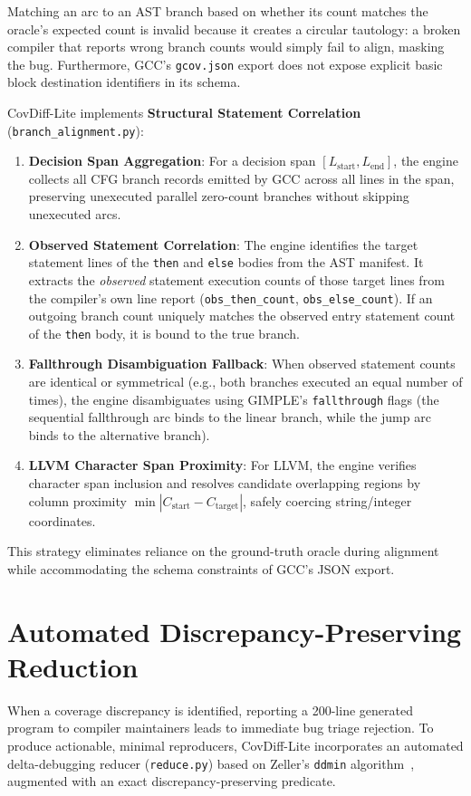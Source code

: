 \documentclass[sigconf,review,anonymous=false]{acmart}
\theoremstyle{definition}
\begin{document}
Matching an arc to an AST branch based on whether its count matches the oracle's expected count is invalid because it creates a circular tautology: a broken compiler that reports wrong branch counts would simply fail to align, masking the bug. Furthermore, GCC's \texttt{gcov.json} export does not expose explicit basic block destination identifiers in its schema.

CovDiff-Lite implements \textbf{Structural Statement Correlation} (\texttt{branch\_alignment.py}):
\begin{enumerate}
    \item \textbf{Decision Span Aggregation}: For a decision span $[L_{\text{start}}, L_{\text{end}}]$, the engine collects all CFG branch records emitted by GCC across all lines in the span, preserving unexecuted parallel zero-count branches without skipping unexecuted arcs.
    \item \textbf{Observed Statement Correlation}: The engine identifies the target statement lines of the \texttt{then} and \texttt{else} bodies from the AST manifest. It extracts the \textit{observed} statement execution counts of those target lines from the compiler's own line report (\texttt{obs\_then\_count}, \texttt{obs\_else\_count}). If an outgoing branch count uniquely matches the observed entry statement count of the \texttt{then} body, it is bound to the true branch.
    \item \textbf{Fallthrough Disambiguation Fallback}: When observed statement counts are identical or symmetrical (e.g., both branches executed an equal number of times), the engine disambiguates using GIMPLE's \texttt{fallthrough} flags (the sequential fallthrough arc binds to the linear branch, while the jump arc binds to the alternative branch).
    \item \textbf{LLVM Character Span Proximity}: For LLVM, the engine verifies character span inclusion and resolves candidate overlapping regions by column proximity $\min |C_{\text{start}} - C_{\text{target}}|$, safely coercing string/integer coordinates.
\end{enumerate}
This strategy eliminates reliance on the ground-truth oracle during alignment while accommodating the schema constraints of GCC's JSON export.

\section{Automated Discrepancy-Preserving Reduction}

When a coverage discrepancy is identified, reporting a 200-line generated program to compiler maintainers leads to immediate bug triage rejection. To produce actionable, minimal reproducers, CovDiff-Lite incorporates an automated delta-debugging reducer (\texttt{reduce.py}) based on Zeller's \texttt{ddmin} algorithm~\cite{zeller2002simplifying}, augmented with an exact discrepancy-preserving predicate.
\end{document}

